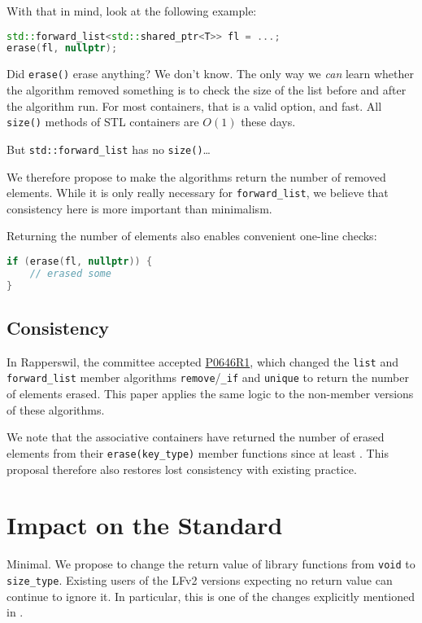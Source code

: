 \documentclass[11pt]{article}
\newcommand{\wgpaper}[1]{\href{https://wg21.link/#1}{#1}}
\begin{document}
With that in mind, look at the following example:
\begin{lstlisting}[language=C++]
std::forward_list<std::shared_ptr<T>> fl = ...;
erase(fl, nullptr);
\end{lstlisting}
Did \texttt{erase()} erase anything? We don't know. The only way we
\emph{can} learn whether the algorithm removed something is to check
the size of the list before and after the algorithm run. For most
containers, that is a valid option, and fast. All \texttt{size()}
methods of STL containers are $O(1)$ these days.

But \texttt{std::forward\_list} has no \texttt{size()}\ldots

We therefore propose to make the algorithms return the number of
removed elements. While it is only really necessary for
\texttt{forward\_list}, we believe that consistency here is more
important than minimalism.

Returning the number of elements also enables convenient one-line
checks:
\begin{lstlisting}[language=C++]
if (erase(fl, nullptr)) {
    // erased some
}
\end{lstlisting}

\subsection{Consistency}

In Rapperswil, the committee accepted \wgpaper{P0646R1}, which changed
the \texttt{list} and \texttt{forward\_list} member algorithms
\texttt{remove}/\texttt{\_if} and \texttt{unique} to return the number
of elements erased. This paper applies the same logic to the
non-member versions of these algorithms.

We note that the associative containers have returned the number of
erased elements from their \texttt{erase(key\_type)} member functions
since at least \cite{STL}. This proposal therefore also restores
lost consistency with existing practice.

\section{Impact on the Standard}

Minimal. We propose to change the return value of library functions
from \texttt{void} to \texttt{size\_type}. Existing users of the LFv2
versions expecting no return value can continue to ignore it. In
particular, this is one of the changes explicitly mentioned in
\cite{P0921R2}.
\end{document}
